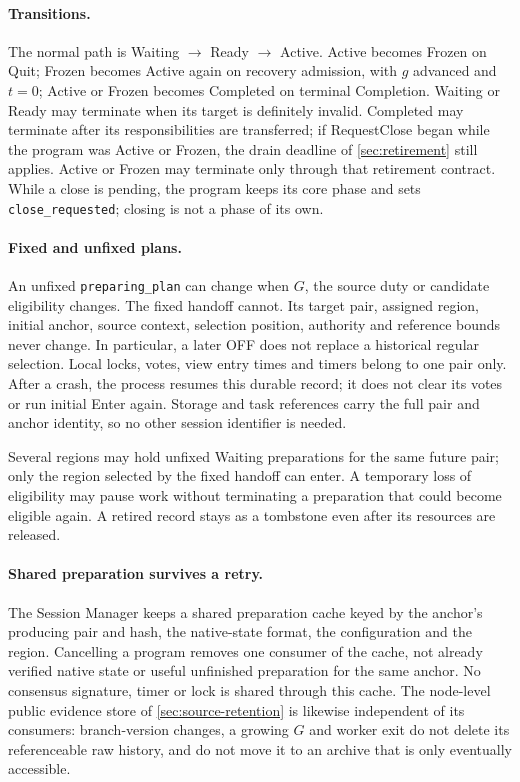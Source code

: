 \documentclass[11pt,a4paper]{article}
\begin{document}
\paragraph{Transitions.}
The normal path is Waiting $\to$ Ready $\to$ Active. Active becomes
Frozen on Quit; Frozen becomes Active again on recovery admission, with
$g$ advanced and $t=0$; Active or Frozen becomes Completed on terminal
Completion. Waiting or Ready may terminate when its target is definitely
invalid. Completed may terminate after its responsibilities are
transferred; if RequestClose began while the program was Active or
Frozen, the drain deadline of \cref{sec:retirement} still applies. Active
or Frozen may terminate only through that retirement contract. While a
close is pending, the program keeps its core phase and sets
\texttt{close\_requested}; closing is not a phase of its own.

\paragraph{Fixed and unfixed plans.}
An unfixed \texttt{preparing\_plan} can change when $G$, the source duty or
candidate eligibility changes. The fixed handoff cannot. Its target pair,
assigned region, initial anchor, source context, selection position,
authority and reference bounds never change. In particular, a later OFF
does not replace a historical regular selection. Local locks, votes, view
entry times and timers belong to one pair only. After a crash, the
process resumes this durable record; it does not clear its votes or run
initial Enter again. Storage and task references carry the full pair and
anchor identity, so no other session identifier is needed.

Several regions may hold unfixed Waiting preparations for the same future
pair; only the region selected by the fixed handoff can enter. A
temporary loss of eligibility may pause work without terminating a
preparation that could become eligible again. A retired record stays as a
tombstone even after its resources are released.

\paragraph{Shared preparation survives a retry.}
The Session Manager keeps a shared preparation cache keyed by the
anchor's producing pair and hash, the native-state format, the
configuration and the region. Cancelling a program removes one consumer
of the cache, not already verified native state or useful unfinished
preparation for the same anchor. No consensus signature, timer or lock is
shared through this cache. The node-level public evidence store of
\cref{sec:source-retention} is likewise independent of its consumers:
branch-version changes, a growing $G$ and worker exit do not delete its
referenceable raw history, and do not move it to an archive that is only
eventually accessible.
\end{document}
